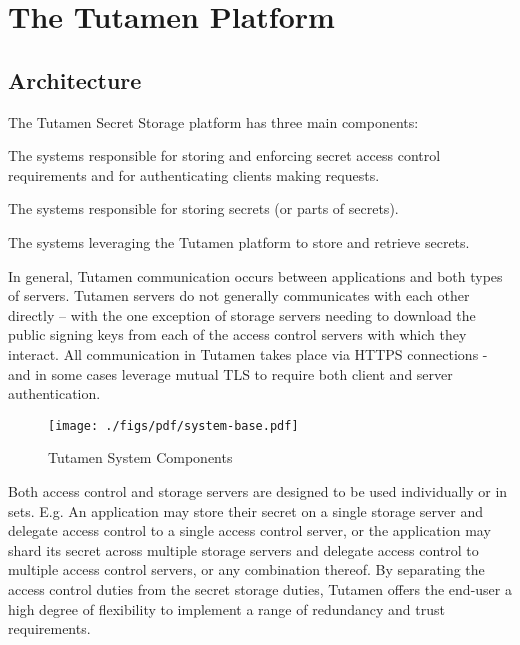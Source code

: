 \section{The Tutamen Platform}
\label{sec:tutamen}

\subsection{Architecture}

The Tutamen Secret Storage platform has three main components:

\begin{packed_desc}
\item[Access Control Servers (ACS):] The systems responsible for
  storing and enforcing secret access control requirements and for
  authenticating clients making requests.
\item[Storage Servers (SS):] The systems responsible for storing
  secrets (or parts of secrets).
\item[Applications:] The systems leveraging the Tutamen platform to
  store and retrieve secrets.
\end{packed_desc}

In general, Tutamen communication occurs between applications and both
types of servers. Tutamen servers do not generally communicates with
each other directly -- with the one exception of storage servers
needing to download the public signing keys from each of the access
control servers with which they interact. All communication in Tutamen
takes place via HTTPS connections - and in some cases leverage mutual
TLS to require both client and server authentication.

\begin{figure}[th]
  \centering
  \texttt{[image: ./figs/pdf/system-base.pdf]}
  \caption{Tutamen System Components}
  \label{fig:tutamen:systembase}
\end{figure}

Both access control and storage servers are designed to be used
individually or in sets. E.g. An application may store their secret
on a single storage server and delegate access control to a single
access control server, or the application may shard its secret across
multiple storage servers and delegate access control to multiple
access control servers, or any combination thereof. By separating the
access control duties from the secret storage duties, Tutamen offers
the end-user a high degree of flexibility to implement a range of
redundancy and trust requirements.

